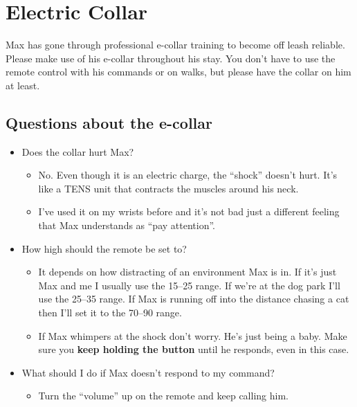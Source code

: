 \documentclass[pdftex,12pt]{article}
\begin{document}
\newpage
\section{Electric Collar}\label{sec:collar}

Max has gone through professional e-collar training to become off leash reliable.
Please make use of his e-collar throughout his stay.
You don't have to use the remote control with his commands or on walks,
but please have the collar on him at least.

\subsection{Questions about the e-collar}

\begin{itemize}
    \item Does the collar hurt Max?
        \begin{itemize}
            \item No. Even though it is an electric charge, the ``shock'' doesn't hurt.
                It's like a TENS unit that contracts the muscles around his neck.
            \item I've used it on my wrists before and it's not bad just
                a different feeling that Max understands as ``pay attention''.
        \end{itemize}
    \item How high should the remote be set to?
        \begin{itemize}
            \item It depends on how distracting of an environment Max is in.
                If it's just Max and me I usually use the 15--25 range.
                If we're at the dog park I'll use the 25--35 range.
                If Max is running off into the distance chasing a cat then I'll set it to the 70--90
                range.
            \item If Max whimpers at the shock don't worry.
                He's just being a baby.
                Make sure you \textbf{keep holding the button} until he responds, even in this case.
        \end{itemize}
    \item What should I do if Max doesn't respond to my command?
        \begin{itemize}
            \item Turn the ``volume'' up on the remote and keep calling him.
        \end{itemize}
\end{itemize}
\end{document}
